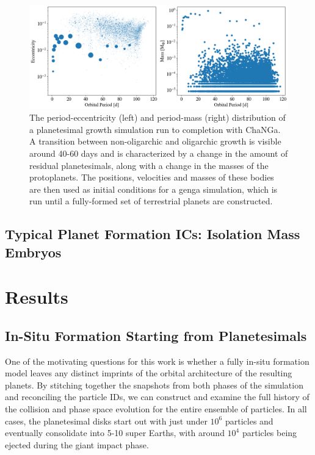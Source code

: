 \begin{figure}
\begin{center}
    \includegraphics[width=\textwidth]{figures/stip/changa_ics.png}
    \caption{The period-eccentricity (left) and period-mass (right) distribution of a planetesimal growth simulation run to completion with {\sc ChaNGa}. A transition between non-oligarchic and oligarchic growth is visible around 40-60 days and is characterized by a change in the amount of residual planetesimals, along with a change in the masses of the protoplanets. The positions, velocities and masses of these bodies are then used as initial conditions for a {\sc genga} simulation, which is run until a fully-formed set of terrestrial planets are constructed.\label{fig:changa_ics}}
\end{center}
\end{figure}

\subsection{Typical Planet Formation ICs: Isolation Mass Embryos}


\section{Results} \label{sec:results}

\subsection{In-Situ Formation Starting from Planetesimals}

One of the motivating questions for this work is whether a fully in-situ formation model leaves any distinct imprints of the orbital architecture of the resulting planets. By stitching together the snapshots from both phases of the simulation and reconciling the particle IDs, we can construct and examine the full history of the collision and phase space evolution for the entire ensemble of particles. In all cases, the planetesimal disks start out with just under $10^{6}$ particles and eventually consolidate into 5-10 super Earths, with around $10^{4}$ particles being ejected during the giant impact phase.

